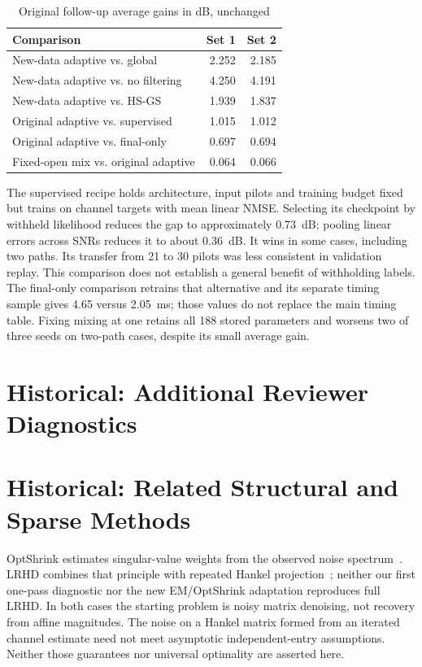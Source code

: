 \documentclass[journal]{IEEEtran}
\begin{document}
\begin{table}[!t]
\caption{Original follow-up average gains in dB, unchanged}
\centering\small
\begin{tabular}{@{}p{}rr@{}}\toprule
Comparison & Set 1 & Set 2\\\midrule
New-data adaptive vs. global & 2.252 & 2.185\\
New-data adaptive vs. no filtering & 4.250 & 4.191\\
New-data adaptive vs. HS-GS & 1.939 & 1.837\\
Original adaptive vs. supervised & 1.015 & 1.012\\
Original adaptive vs. final-only & 0.697 & 0.694\\
Fixed-open mix vs. original adaptive & 0.064 & 0.066\\\bottomrule
\end{tabular}
\end{table}
The supervised recipe holds architecture, input pilots and training
budget fixed but trains on channel targets with mean linear NMSE.
Selecting its checkpoint by withheld likelihood reduces the gap to
approximately 0.73~dB; pooling linear errors across SNRs reduces it to
about 0.36~dB. It wins in some cases, including two paths. Its transfer
from 21 to 30 pilots was less consistent in validation replay. This
comparison does not establish a general benefit of withholding labels.
The final-only comparison retrains that alternative and its separate
timing sample gives 4.65 versus 2.05~ms; those values do not replace the
main timing table. Fixing mixing at one retains all 188 stored parameters
and worsens two of three seeds on two-path cases, despite its small
average gain.

\section{Historical: Additional Reviewer Diagnostics}






\section{Historical: Related Structural and Sparse Methods}
OptShrink estimates singular-value weights from the observed noise
spectrum~\cite{nadakuditi2014}. LRHD combines that principle with
repeated Hankel projection~\cite{yin2021}; neither our first one-pass
diagnostic nor the new EM/OptShrink adaptation reproduces full LRHD. In both
cases the starting problem is noisy matrix denoising, not recovery from
affine magnitudes. The noise on a Hankel matrix formed from an iterated
channel estimate need not meet asymptotic independent-entry assumptions.
Neither those guarantees nor universal optimality are asserted here.
\end{document}

